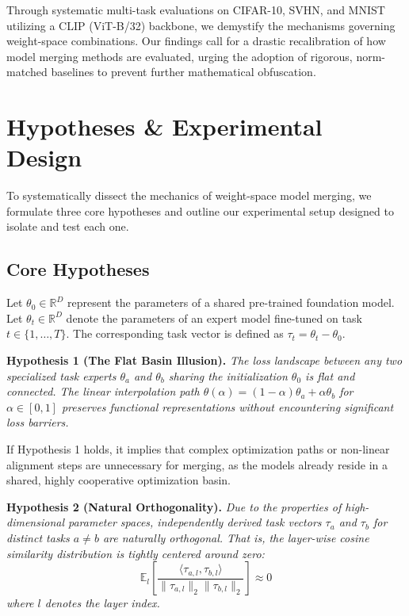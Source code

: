 \documentclass{article}
\begin{document}
Through systematic multi-task evaluations on CIFAR-10, SVHN, and MNIST utilizing a CLIP (ViT-B/32) backbone, we demystify the mechanisms governing weight-space combinations. Our findings call for a drastic recalibration of how model merging methods are evaluated, urging the adoption of rigorous, norm-matched baselines to prevent further mathematical obfuscation.

\section{Hypotheses \& Experimental Design}
\label{sec:hypotheses}

To systematically dissect the mechanics of weight-space model merging, we formulate three core hypotheses and outline our experimental setup designed to isolate and test each one.

\subsection{Core Hypotheses}

Let $\theta_0 \in \mathbb{R}^D$ represent the parameters of a shared pre-trained foundation model. Let $\theta_t \in \mathbb{R}^D$ denote the parameters of an expert model fine-tuned on task $t \in \{1, \dots, T\}$. The corresponding task vector is defined as $\tau_t = \theta_t - \theta_0$.

\textbf{Hypothesis 1 (The Flat Basin Illusion).} \textit{The loss landscape between any two specialized task experts $\theta_a$ and $\theta_b$ sharing the initialization $\theta_0$ is flat and connected. The linear interpolation path $\theta(\alpha) = (1-\alpha)\theta_a + \alpha\theta_b$ for $\alpha \in [0,1]$ preserves functional representations without encountering significant loss barriers.}

If Hypothesis 1 holds, it implies that complex optimization paths or non-linear alignment steps are unnecessary for merging, as the models already reside in a shared, highly cooperative optimization basin.

\textbf{Hypothesis 2 (Natural Orthogonality).} \textit{Due to the properties of high-dimensional parameter spaces, independently derived task vectors $\tau_a$ and $\tau_b$ for distinct tasks $a \neq b$ are naturally orthogonal. That is, the layer-wise cosine similarity distribution is tightly centered around zero:}
\begin{equation}
    \mathbb{E}_l \left[ \frac{\langle \tau_{a,l}, \tau_{b,l} \rangle}{\|\tau_{a,l}\|_2 \|\tau_{b,l}\|_2} \right] \approx 0
\end{equation}
\textit{where $l$ denotes the layer index.}
\end{document}
